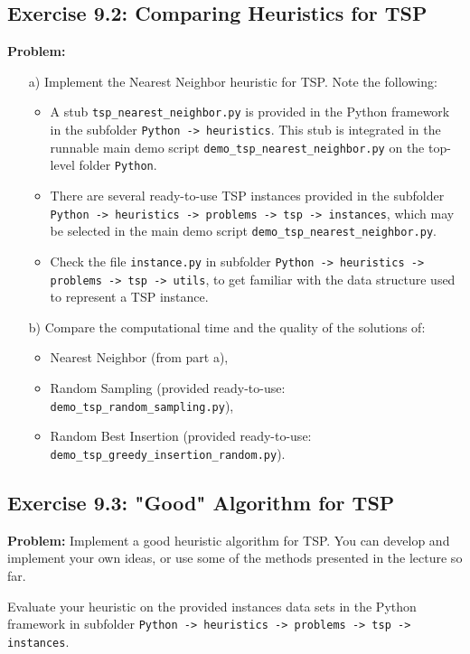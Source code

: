 \subsection{Exercise 9.2: Comparing Heuristics for TSP}
\textbf{Problem:}
\begin{enumerate}
\item[a)] Implement the Nearest Neighbor heuristic for TSP. Note the following:
\begin{itemize}
\item A stub \texttt{tsp\_nearest\_neighbor.py} is provided in the Python framework in the subfolder \texttt{Python -> heuristics}. This stub is integrated in the runnable main demo script \texttt{demo\_tsp\_nearest\_neighbor.py} on the top-level folder \texttt{Python}.
\item There are several ready-to-use TSP instances provided in the subfolder \texttt{Python -> heuristics -> problems -> tsp -> instances}, which may be selected in the main demo script \texttt{demo\_tsp\_nearest\_neighbor.py}.
\item Check the file \texttt{instance.py} in subfolder \texttt{Python -> heuristics -> problems -> tsp -> utils}, to get familiar with the data structure used to represent a TSP instance.
\end{itemize}
\item[b)] Compare the computational time and the quality of the solutions of:
\begin{itemize}
\item Nearest Neighbor (from part a),
\item Random Sampling (provided ready-to-use: \texttt{demo\_tsp\_random\_sampling.py}),
\item Random Best Insertion (provided ready-to-use: \texttt{demo\_tsp\_greedy\_insertion\_random.py}).
\end{itemize}
\end{enumerate}

\subsection{Exercise 9.3: "Good" Algorithm for TSP}
\textbf{Problem:}
Implement a good heuristic algorithm for TSP. You can develop and implement your own ideas, or use some of the methods presented in the lecture so far.

Evaluate your heuristic on the provided instances data sets in the Python framework in subfolder \texttt{Python -> heuristics -> problems -> tsp -> instances}. 

